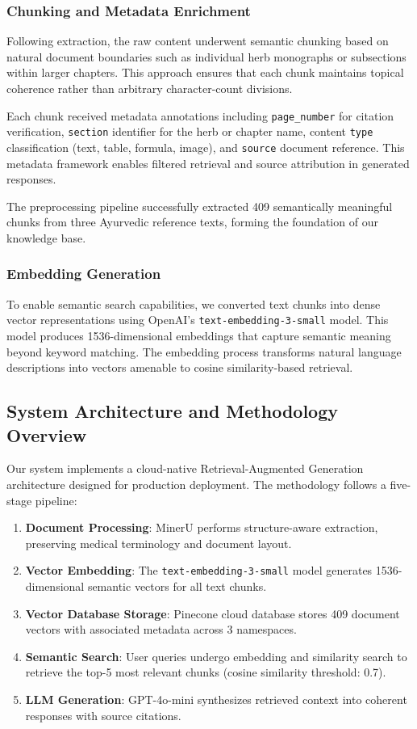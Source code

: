 \documentclass[conference]{IEEEtran}
\begin{document}
\subsubsection{Chunking and Metadata Enrichment}
Following extraction, the raw content underwent semantic chunking based on natural document boundaries such as individual herb monographs or subsections within larger chapters. This approach ensures that each chunk maintains topical coherence rather than arbitrary character-count divisions.

Each chunk received metadata annotations including \texttt{page\_number} for citation verification, \texttt{section} identifier for the herb or chapter name, content \texttt{type} classification (text, table, formula, image), and \texttt{source} document reference. This metadata framework enables filtered retrieval and source attribution in generated responses.

The preprocessing pipeline successfully extracted 409 semantically meaningful chunks from three Ayurvedic reference texts, forming the foundation of our knowledge base.

\subsubsection{Embedding Generation}
To enable semantic search capabilities, we converted text chunks into dense vector representations using OpenAI's \texttt{text-embedding-3-small} model. This model produces 1536-dimensional embeddings that capture semantic meaning beyond keyword matching. The embedding process transforms natural language descriptions into vectors amenable to cosine similarity-based retrieval.

\subsection{System Architecture and Methodology Overview}

Our system implements a cloud-native Retrieval-Augmented Generation architecture designed for production deployment. The methodology follows a five-stage pipeline:

\begin{enumerate}
    \item \textbf{Document Processing}: MinerU performs structure-aware extraction, preserving medical terminology and document layout.
    \item \textbf{Vector Embedding}: The \texttt{text-embedding-3-small} model generates 1536-dimensional semantic vectors for all text chunks.
    \item \textbf{Vector Database Storage}: Pinecone cloud database stores 409 document vectors with associated metadata across 3 namespaces.
    \item \textbf{Semantic Search}: User queries undergo embedding and similarity search to retrieve the top-5 most relevant chunks (cosine similarity threshold: 0.7).
    \item \textbf{LLM Generation}: GPT-4o-mini synthesizes retrieved context into coherent responses with source citations.
\end{enumerate}
\end{document}
